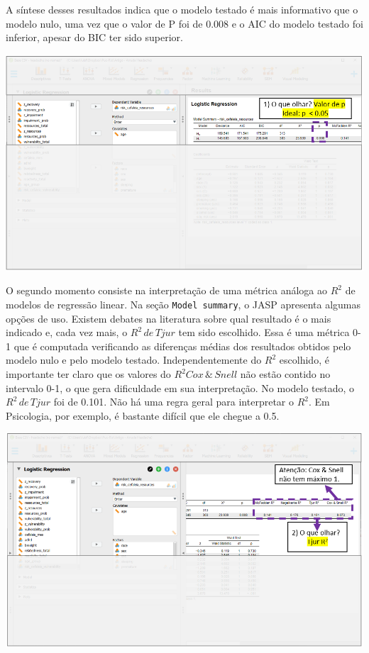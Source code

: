 \documentclass[
]{book}
\begin{document}
A síntese desses resultados indica que o modelo testado é mais informativo que o modelo nulo, uma vez que o valor de P foi de 0.008 e o AIC do modelo testado foi inferior, apesar do BIC ter sido superior.

\includegraphics{./img/cap_logistica_resultado_1.png}

O segundo momento consiste na interpretação de uma métrica análoga ao \(R^2\) de modelos de regressão linear. Na seção \texttt{Model\ summary}, o JASP apresenta algumas opções de uso. Existem debates na literatura sobre qual resultado é o mais indicado e, cada vez mais, o \(R^2 \, de \, Tjur\) tem sido escolhido. Essa é uma métrica 0-1 que é computada verificando as diferenças médias dos resultados obtidos pelo modelo nulo e pelo modelo testado. Independentemente do \(R^2\) escolhido, é importante ter claro que os valores do \(R^2 {Cox\,\& \,Snell}\) não estão contido no intervalo 0-1, o que gera dificuldade em sua interpretação. No modelo testado, o \(R^2 \, de \, Tjur\) foi de 0.101. Não há uma regra geral para interpretar o \(R^2\). Em Psicologia, por exemplo, é bastante difícil que ele chegue a 0.5.

\includegraphics{./img/cap_logistica_resultado_2.png}
\end{document}
